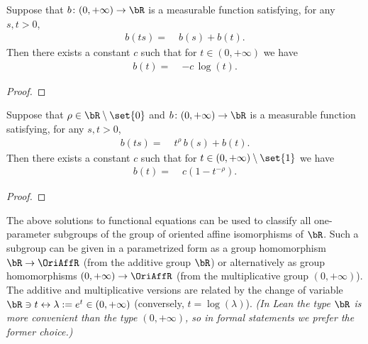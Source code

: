 \begin{lemma}[Functional equation translation coefficient solution with $\rho = 0$]
  \label{lem:solution-functional-eqn-translation-no-scaling}
  \leanok
  Suppose that
  $b \colon (0,+\infty) \to \bR$ is a measurable function
  satisfying, for any $s, t > 0$,
  \begin{align*}
    b(t s) = \; & b(s) + b(t) .
  \end{align*}
  Then there exists a constant $c$ such that for $t \in (0,+\infty)$
  we have
  \begin{align*}
    b(t) = \; & -c \, \log (t) .
  \end{align*}
\end{lemma}
\begin{proof}
  \leanok
\end{proof}

\begin{lemma}
  \label{lem:solution-functional-eqn-translation-with-scaling}
  \leanok
  Suppose that $\rho \in \bR \setminus \set{0}$ and
  $b \colon (0,+\infty) \to \bR$ is a measurable function
  satisfying, for any $s, t > 0$,
  \begin{align*}
    b(t s) = \; & t^{\rho} \, b(s) + b(t) .
  \end{align*}
  Then there exists a constant $c$ such that for $t \in (0,+\infty) \setminus \set{1}$
  we have
  \begin{align*}
    b(t) = \; & c (1 - t^{-\rho}) .
  \end{align*}
\end{lemma}
\begin{proof}
  \leanok
\end{proof}

The above solutions to functional equations can be used to classify all
one-parameter subgroups of the group of oriented affine isomorphisms of $\bR$.
Such a subgroup can be given in a parametrized form as a group homomorphism
$\bR \to \OriAffR$ (from the additive group $\bR$) or alternatively
as group homomorphisms $(0,+\infty) \to \OriAffR$ (from the multiplicative
group $(0,+\infty)$). The additive and multiplicative versions are
related by the change of variable
$\bR \ni t \leftrightarrow \lambda := e^t \in (0,+\infty)$
(conversely, $t = \log(\lambda)$).
\emph{(In Lean the type $\bR$ is more convenient than the type $(0,+\infty)$,
so in formal statements we prefer the former choice.)}

